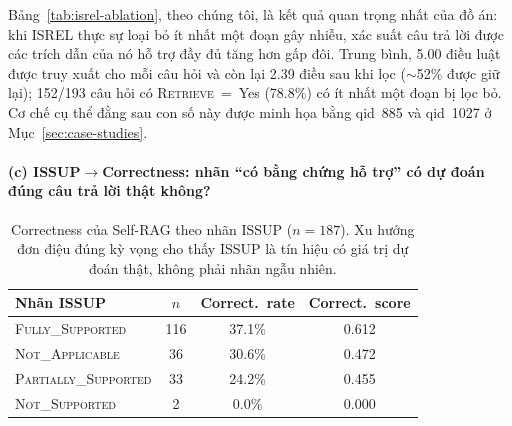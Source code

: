 \documentclass[11pt]{article}
\begin{document}
Bảng~\ref{tab:isrel-ablation}, theo chúng tôi, là kết quả quan trọng nhất của đồ án: khi \textsc{ISREL} thực sự loại bỏ ít nhất một đoạn gây nhiễu, xác suất câu trả lời được các trích dẫn của nó hỗ trợ đầy đủ tăng hơn gấp đôi. Trung bình, 5.00 điều luật được truy xuất cho mỗi câu hỏi và còn lại 2.39 điều sau khi lọc ($\sim$52\% được giữ lại); 152/193 câu hỏi có \textsc{Retrieve}~=~Yes (78.8\%) có ít nhất một đoạn bị lọc bỏ. Cơ chế cụ thể đằng sau con số này được minh họa bằng qid~885 và qid~1027 ở Mục~\ref{sec:case-studies}.

\paragraph{(c) \textsc{ISSUP}$\to$Correctness: nhãn ``có bằng chứng hỗ trợ'' có dự đoán đúng câu trả lời thật không?}

\begin{table}[t]
\centering
\small
\begin{tabular}{@{}lccc@{}}
\toprule
\textbf{Nhãn \textsc{ISSUP}} & \textbf{$n$} & \textbf{Correct.\ rate} & \textbf{Correct.\ score} \\
\midrule
\textsc{Fully\_Supported} & 116 & 37.1\% & 0.612 \\
\textsc{Not\_Applicable} & 36 & 30.6\% & 0.472 \\
\textsc{Partially\_Supported} & 33 & 24.2\% & 0.455 \\
\textsc{Not\_Supported} & 2 & 0.0\% & 0.000 \\
\bottomrule
\end{tabular}
\caption{Correctness của Self-RAG theo nhãn \textsc{ISSUP} ($n=187$). Xu hướng đơn điệu đúng kỳ vọng cho thấy \textsc{ISSUP} là tín hiệu có giá trị dự đoán thật, không phải nhãn ngẫu nhiên.}
\label{tab:issup-correctness}
\end{table}
\end{document}
